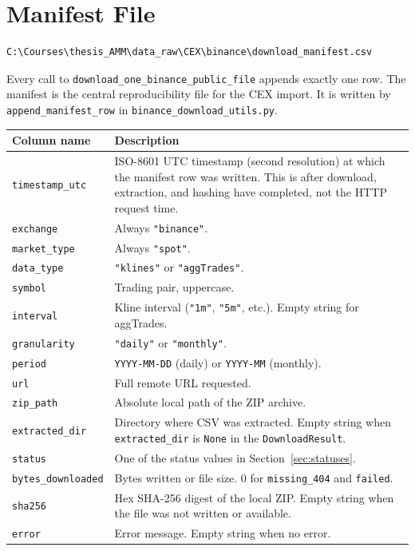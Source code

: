 \documentclass[11pt,a4paper]{article}
\begin{document}
\section{Manifest File}
\label{sec:manifest}

\begin{lstlisting}
C:\Courses\thesis_AMM\data_raw\CEX\binance\download_manifest.csv
\end{lstlisting}

Every call to \texttt{download\_one\_binance\_public\_file} appends
exactly one row. The manifest is the central reproducibility file for
the CEX import. It is written by \texttt{append\_manifest\_row} in
\texttt{binance\_download\_utils.py}.

\begin{xltabular}{\linewidth}{L{4.0cm}Y}
\toprule
\textbf{Column name} & \textbf{Description} \\
\midrule
\texttt{timestamp\_utc} &
  ISO-8601 UTC timestamp (second resolution) at which the manifest
  row was written. This is after download, extraction, and hashing
  have completed, not the HTTP request time. \\
\texttt{exchange} & Always \texttt{"binance"}. \\
\texttt{market\_type} & Always \texttt{"spot"}. \\
\texttt{data\_type} & \texttt{"klines"} or \texttt{"aggTrades"}. \\
\texttt{symbol} & Trading pair, uppercase. \\
\texttt{interval} & Kline interval (\texttt{"1m"}, \texttt{"5m"}, etc.).
  Empty string for aggTrades. \\
\texttt{granularity} & \texttt{"daily"} or \texttt{"monthly"}. \\
\texttt{period} & \texttt{YYYY-MM-DD} (daily) or \texttt{YYYY-MM}
  (monthly). \\
\texttt{url} & Full remote URL requested. \\
\texttt{zip\_path} & Absolute local path of the ZIP archive. \\
\texttt{extracted\_dir} & Directory where CSV was extracted. Empty
  string when \texttt{extracted\_dir} is \texttt{None} in the
  \texttt{DownloadResult}. \\
\texttt{status} & One of the status values in
  Section~\ref{sec:statuses}. \\
\texttt{bytes\_downloaded} & Bytes written or file size. 0 for
  \texttt{missing\_404} and \texttt{failed}. \\
\texttt{sha256} & Hex SHA-256 digest of the local ZIP. Empty string
  when the file was not written or available. \\
\texttt{error} & Error message. Empty string when no error. \\
\bottomrule
\end{xltabular}
\end{document}
